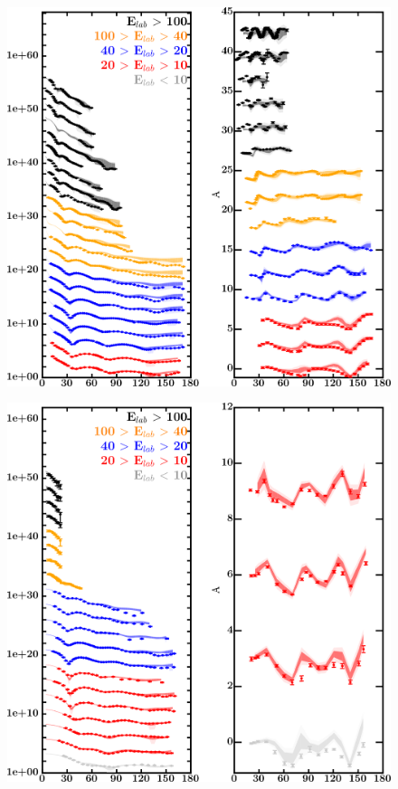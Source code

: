 \documentclass[twocolumn,secnumarabic,amssymb, nobibnotes, aps, prl,
superscriptaddress, nobalancelastpage, draft]{revtex4}
\begin{document}
\begin{figure}[!htb]
    \centering
    \begin{minipage}{0.4\linewidth}
        \centering
        \includegraphics[width=\linewidth]{figures/ca40_protonElastic.png}
        \label{DOM_ca40_proton_elastic}
    \end{minipage}\hspace{6pt}
    \begin{minipage}{0.4\linewidth}
        \centering
        \includegraphics[width=\linewidth]{figures/ca40_neutronElastic.png}

\end{minipage}
\end{figure}
\end{document}
